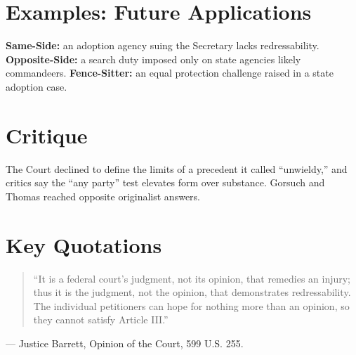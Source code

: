 \documentclass[12pt]{article}
\begin{document}
\section{Examples: Future Applications}
\textbf{Same-Side:} an adoption agency suing the Secretary lacks redressability. \textbf{Opposite-Side:} a search duty imposed only on state agencies likely commandeers. \textbf{Fence-Sitter:} an equal protection challenge raised in a state adoption case.

\section{Critique}
The Court declined to define the limits of a precedent it called ``unwieldy,'' and critics say the ``any party'' test elevates form over substance. Gorsuch and Thomas reached opposite originalist answers.

\section{Key Quotations}
\begin{quote}
``It is a federal court's judgment, not its opinion, that remedies an injury; thus it is the judgment, not the opinion, that demonstrates redressability. The individual petitioners can hope for nothing more than an opinion, so they cannot satisfy Article III.''
\end{quote}
\noindent --- Justice Barrett, Opinion of the Court, 599 U.S. 255.
\end{document}
